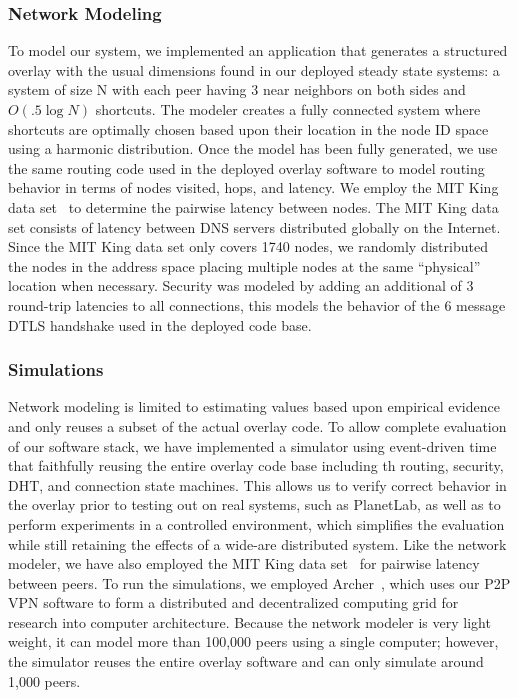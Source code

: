 \documentclass[conference]{IEEEtran}
\begin{document}
\subsubsection{Network Modeling}
To model our system, we implemented an application that generates a structured
overlay with the usual dimensions found in our deployed steady state systems:
a system of size N with each peer having 3 near neighbors on both sides and
$O(.5\log N)$ shortcuts.  The modeler creates a fully connected system where
shortcuts are optimally chosen based upon their location in the node ID space
using a harmonic distribution.  Once the model has been fully generated, we use
the same routing code used in the deployed overlay software to model routing
behavior in terms of nodes visited, hops, and latency.  We employ
the MIT King data set~\cite{king_data} to determine the pairwise latency
between nodes.  The MIT King data set consists of latency between DNS servers
distributed globally on the Internet.  Since the MIT King data set only covers
1740 nodes, we randomly distributed the nodes in the address space placing
multiple nodes at the same ``physical'' location when necessary.  Security
was modeled by adding an additional of 3 round-trip latencies to all
connections, this models the behavior of the 6 message DTLS handshake used in
the deployed code base.

\subsubsection{Simulations}
Network modeling is limited to estimating values based upon empirical evidence
and only reuses a subset of the actual overlay code.  To allow complete
evaluation of our software stack, we have implemented a simulator using
event-driven time that faithfully reusing the entire overlay code base including
th routing, security, DHT, and connection state machines.  This allows us
to verify correct behavior in the overlay prior to testing out on real systems,
such as PlanetLab, as well as to perform experiments in a controlled
environment, which simplifies the evaluation while still retaining the effects
of a wide-are distributed system.  Like the network modeler, we have also employed
the MIT King data set~\cite{king_data} for pairwise latency between peers.
To run the simulations, we employed Archer~\cite{archer}, which uses our P2P
VPN software to form a distributed and decentralized computing grid for
research into computer architecture.  Because the network modeler is very
light weight, it can model more than 100,000 peers using a single computer;
however, the simulator reuses the entire overlay software and can only simulate
around 1,000 peers.
\end{document}
